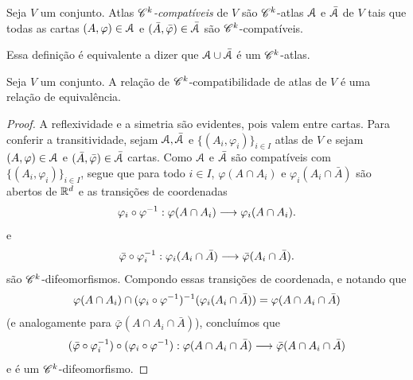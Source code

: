\begin{defi}
Seja $V$ um conjunto. Atlas \emph{$\mathscr{C}^k$-compatíveis} de $V$ são $\mathscr{C}^k$-atlas $\mathcal{A}$ e $\bar{\mathcal{A}}$ de $V$ tais que todas as cartas $(A,\varphi) \in \mathcal{A}$ e $(\bar A,\bar\varphi) \in \bar {\mathcal{A}}$ são $\mathscr{C}^k$-compatíveis.
\end{defi}

Essa definição é equivalente a dizer que $\mathcal{A} \cup \bar {\mathcal{A}}$ é um $\mathscr{C}^k$-atlas.

\begin{prop}
Seja $V$ um conjunto. A relação de $\mathscr{C}^k$-compatibilidade de atlas de $V$ é uma relação de equivalência.
\end{prop}
\begin{proof}
A reflexividade e a simetria são evidentes, pois valem entre cartas. Para conferir a transitividade, sejam $\mathcal{A},\bar{\mathcal{A}}$ e $\{(A_i,\varphi_i)\}_{i \in I}$ atlas de $V$ e sejam $(A,\varphi) \in \mathcal{A}$ e $(\bar A,\bar\varphi) \in \bar{\mathcal{A}}$ cartas. 
Como $\mathcal{A}$ e $\bar{\mathcal{A}}$ são compatíveis com $\{(A_i,\varphi_i)\}_{i \in I}$, segue que para todo $i \in I$, $\varphi(A \cap A_i)$ e $\varphi_i(A_i \cap \bar A)$ são abertos de $\mathbb{R}^d$ e as transições de coordenadas
	\begin{equation*}
	\varphi_i \circ \varphi^{-1}: \varphi(A \cap A_i) \longrightarrow \varphi_i(A \cap A_i).
	\end{equation*}
e
	\begin{equation*}
	\bar\varphi \circ \varphi_i^{-1}: \varphi_i(A_i \cap \bar A) \longrightarrow \bar\varphi(A_i \cap \bar A).
	\end{equation*}
são $\mathscr{C}^k$-difeomorfismos. Compondo essas transições de coordenada, e notando que
	\begin{equation*}
	\varphi(A \cap A_i) \cap (\varphi_i \circ \varphi^{-1})^{-1}(\varphi_i(A_i \cap \bar A)) = \varphi(A \cap A_i \cap \bar A)
	\end{equation*}
(e analogamente para $\bar\varphi(A \cap A_i \cap \bar A)$), concluímos que
	\begin{equation*}
	(\bar\varphi \circ \varphi_i^{-1}) \circ (\varphi_i \circ \varphi^{-1}): \varphi(A \cap A_i \cap \bar A) \longrightarrow \bar\varphi(A \cap A_i \cap \bar A)
	\end{equation*}
e é um $\mathscr{C}^k$-difeomorfismo. 


\end{proof}

